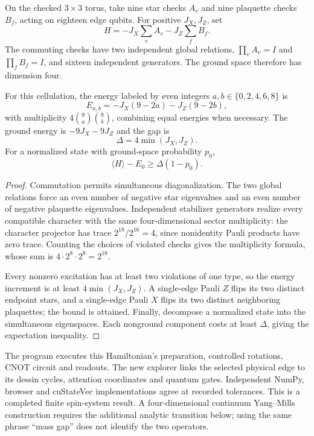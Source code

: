 On the checked $3\times3$ torus, take nine star checks $A_v$ and nine plaquette checks $B_f$, acting on eighteen edge qubits. For positive $J_X,J_Z$, set
\[
 H=-J_X\sum_v A_v-J_Z\sum_f B_f.
\]
The commuting checks have two independent global relations, $\prod_vA_v=I$ and $\prod_fB_f=I$, and sixteen independent generators. The ground space therefore has dimension four.

\begin{theorem}
For this cellulation, the energy labeled by even integers $a,b\in\{0,2,4,6,8\}$ is
\[
 E_{a,b}=-J_X(9-2a)-J_Z(9-2b),
\]
with multiplicity $4\binom9a\binom9b$, combining equal energies when necessary. The ground energy is $-9J_X-9J_Z$ and the gap is
\[
 \Delta=4\min(J_X,J_Z).
\]
For a normalized state with ground-space probability $p_0$,
\[
 \langle H\rangle-E_0\ge\Delta(1-p_0).
\]
\end{theorem}
\begin{proof}
Commutation permits simultaneous diagonalization. The two global relations force an even number of negative star eigenvalues and an even number of negative plaquette eigenvalues. Independent stabilizer generators realize every compatible character with the same four-dimensional sector multiplicity: the character projector has trace $2^{18}/2^{16}=4$, since nonidentity Pauli products have zero trace. Counting the choices of violated checks gives the multiplicity formula, whose sum is $4\cdot2^8\cdot2^8=2^{18}$.

Every nonzero excitation has at least two violations of one type, so the energy increment is at least $4\min(J_X,J_Z)$. A single-edge Pauli $Z$ flips its two distinct endpoint stars, and a single-edge Pauli $X$ flips its two distinct neighboring plaquettes; the bound is attained. Finally, decompose a normalized state into the simultaneous eigenspaces. Each nonground component costs at least $\Delta$, giving the expectation inequality.
\end{proof}

The program executes this Hamiltonian's preparation, controlled rotations, CNOT circuit and readouts. The new explorer links the selected physical edge to its dessin cycles, attention coordinates and quantum gates. Independent NumPy, browser and cuStateVec implementations agree at recorded tolerances. This is a completed finite spin-system result. A four-dimensional continuum Yang--Mills construction requires the additional analytic transition below; using the same phrase ``mass gap'' does not identify the two operators.

